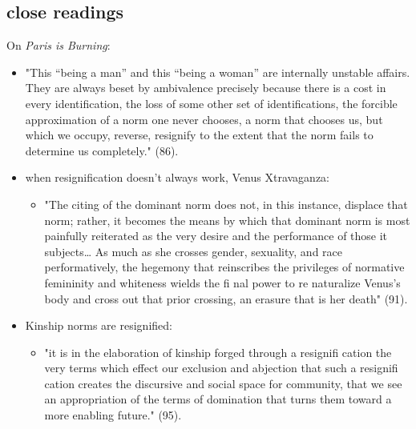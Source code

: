 \documentclass[11pt]{article}
\begin{document}
\subsection{close readings}
\label{sec:org31bfc35}
On \emph{Paris is Burning}:
\begin{itemize}
\item "This “being a man” and this “being a woman” are internally
unstable affairs. They are always beset by ambivalence precisely
because there is a cost in every identification, the loss of some
other set of identifications, the forcible approximation of a norm
one never chooses, a norm that chooses us, but which we occupy,
reverse, resignify to the extent that the norm fails to determine
us completely." (86).
\item when resignification doesn't always work, Venus Xtravaganza:
\begin{itemize}
\item "The citing of the dominant norm does not, in this instance,
displace that norm; rather, it becomes the means by which that
dominant norm is most painfully reiterated as the very desire
and the performance of those it subjects\ldots{} As much as she
crosses gender, sexuality, and race performatively, the hegemony
that reinscribes the privileges of normative femininity and
whiteness wields the fi nal power to re naturalize Venus’s body
and cross out that prior crossing, an erasure that is her death"
(91).
\end{itemize}
\item Kinship norms are resignified:
\begin{itemize}
\item "it is in the elaboration of kinship forged through a resignifi
cation the very terms which effect our exclusion and abjection
that such a resignifi cation creates the discursive and social
space for community, that we see an appropriation of the terms of
domination that turns them toward a more enabling future." (95).
\end{itemize}
\end{itemize}
\end{document}
